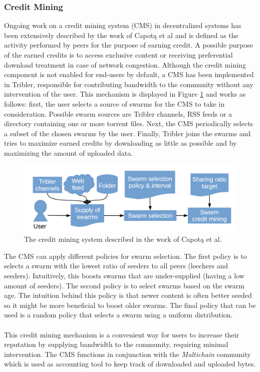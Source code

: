 \subsubsection{\textbf{Credit Mining}}
Ongoing work on a credit mining system (CMS) in decentralized systems has been extensively described by the work of Capot\k{a} et al\cite{capotka2015decentralized} and is defined as the activity performed by peers for the purpose of earning credit. A possible purpose of the earned credits is to access exclusive content or receiving preferential download treatment in case of network congestion. Although the credit mining component is not enabled for end-users by default, a CMS has been implemented in Tribler, responsible for contributing bandwidth to the community without any intervention of the user. This mechanism is displayed in Figure \ref{fig:credit-mining} and works as follows: first, the user selects a source of swarms for the CMS to take in consideration. Possible swarm sources are Tribler channels, RSS feeds or a directory containing one or more torrent files. Next, the CMS periodically selects a subset of the chosen swarms by the user. Finally, Tribler joins the swarms and tries to maximize earned credits by downloading as little as possible and by maximizing the amount of uploaded data.\\

\begin{figure}[h!]
	\centering
	\includegraphics[width=0.7\columnwidth]{images/architecture/credit_mining}
	\caption{The credit mining system described in the work of Capot\k{a} et al.\cite{capotka2015decentralized}}
	\label{fig:credit-mining}
\end{figure}

\noindent The CMS can apply different policies for swarm selection. The first policy is to selects a swarm with the lowest ratio of seeders to all peers (leechers and seeders). Intuitively, this boosts swarms that are under-supplied (having a low amount of seeders). The second policy is to select swarms based on the swarm age. The intuition behind this policy is that newer content is often better seeded so it might be more beneficial to boost older swarms. The final policy that can be used is a random policy that selects a swarm using a uniform distribution.\\\\
This credit mining mechanism is a convenient way for users to increase their reputation by supplying bandwidth to the community, requiring minimal intervention. The CMS functions in conjunction with the \emph{Multichain} community which is used as accounting tool to keep track of downloaded and uploaded bytes.

